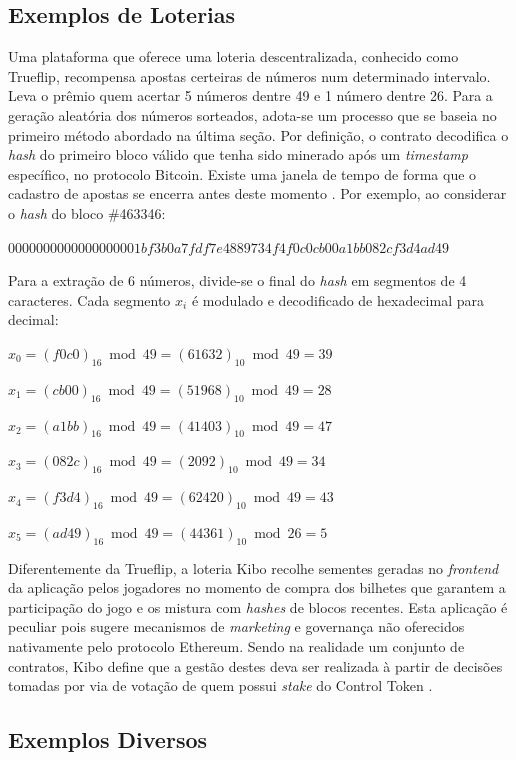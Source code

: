 \documentclass[a4paper,12pt]{monografia}
\theoremstyle{plain}
\theoremstyle{definition}
\theoremstyle{remark}
\begin{document}
\subsection{Exemplos de Loterias}
Uma plataforma que oferece uma loteria descentralizada, conhecido como Trueflip, recompensa apostas certeiras de n\'{u}meros num determinado intervalo.
Leva o pr\^{e}mio quem acertar 5 n\'{u}meros dentre 49 e 1 n\'{u}mero dentre 26.
Para a gera\c{c}\~{a}o aleat\'{o}ria dos n\'{u}meros sorteados, adota-se um processo que se baseia no primeiro m\'{e}todo abordado na \'{u}ltima se\c{c}\~{a}o.
Por defini\c{c}\~{a}o, o contrato decodifica o \textit{hash} do primeiro bloco v\'{a}lido que tenha sido minerado ap\'{o}s um \textit{timestamp} espec\'{i}fico, no protocolo Bitcoin.
Existe uma janela de tempo de forma que o cadastro de apostas se encerra antes deste momento \cite{trueflip}.
Por exemplo, ao considerar o \textit{hash} do bloco \#463346:

$0000000000000000001bf3b0a7fdf7e4889734f4f0c0cb00a1bb082cf3d4ad49$

Para a extra\c{c}\~{a}o de 6 n\'{u}meros, divide-se o final do \textit{hash} em segmentos de 4 caracteres.
Cada segmento $x_i$ \'{e} modulado e decodificado de hexadecimal para decimal:

$x_0=(f0c0)_{16} \bmod 49=(61632)_{10} \bmod 49=39$

$x_1=(cb00)_{16} \bmod 49=(51968)_{10} \bmod 49=28$

$x_2=(a1bb)_{16} \bmod 49=(41403)_{10} \bmod 49=47$

$x_3=(082c)_{16} \bmod 49=(2092)_{10} \bmod 49=34$

$x_4=(f3d4)_{16} \bmod 49=(62420)_{10} \bmod 49=43$

$x_5=(ad49)_{16} \bmod 49=(44361)_{10} \bmod 26=5$

Diferentemente da Trueflip, a loteria Kibo recolhe sementes geradas no \textit{frontend} da aplica\c{c}\~{a}o pelos jogadores no momento de compra dos bilhetes que garantem a participa\c{c}\~{a}o do jogo e os mistura com \textit{hashes} de blocos recentes.
Esta aplica\c{c}\~{a}o \'{e} peculiar pois sugere mecanismos de \textit{marketing} e governan\c{c}a n\~{a}o oferecidos nativamente pelo protocolo Ethereum.
Sendo na realidade um conjunto de contratos, Kibo define que a gest\~{a}o destes deva ser realizada \`{a} partir de decis\~{o}es tomadas por via de vota\c{c}\~{a}o de quem possui \textit{stake} do Control Token \cite{kibo}.

\subsection{Exemplos Diversos}
\end{document}
